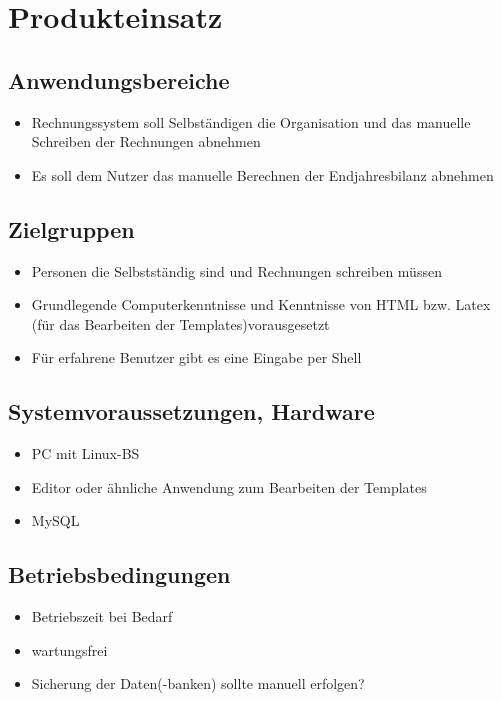 
\section{Produkteinsatz}


\subsection{Anwendungsbereiche}

\begin{itemize}
	\item Rechnungssystem soll Selbständigen die Organisation und das manuelle Schreiben der Rechnungen abnehmen
	\item Es soll dem Nutzer das manuelle Berechnen der Endjahresbilanz abnehmen
\end{itemize}

\subsection{Zielgruppen}

\begin{itemize}
	\item Personen die Selbstständig sind und Rechnungen schreiben müssen
	\item Grundlegende Computerkenntnisse und Kenntnisse von HTML bzw. Latex (für das Bearbeiten der Templates)vorausgesetzt
	\item Für erfahrene Benutzer gibt es eine Eingabe per Shell
\end{itemize}

\subsection{Systemvoraussetzungen, Hardware}

\begin{itemize}
	\item PC mit Linux-BS
	\item Editor oder ähnliche Anwendung zum Bearbeiten der Templates
	\item MySQL
\end{itemize}

\subsection{Betriebsbedingungen}

\begin{itemize}
	\item Betriebszeit bei Bedarf
	\item wartungsfrei
	\item Sicherung der Daten(-banken) sollte manuell erfolgen?
\end{itemize}